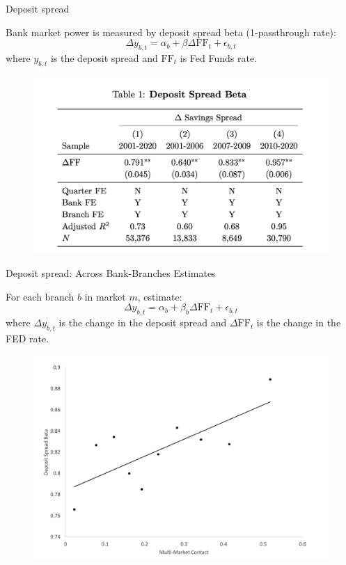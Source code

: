 \documentclass[notes,10.2pt, aspectratio=169]{beamer}
\newenvironment{wideitemize}{\itemize\addtolength{\itemsep}{10pt}}{\enditemize}
\begin{document}
\begin{frame}{Deposit spread}
    \vspace{0.1cm}
    \begin{wideitemize}
    \item Bank market power is measured by deposit spread beta (1-passthrough rate): 
    $$\Delta y_{b, t}=\alpha_b+\beta \Delta \mathrm{FF}_t+\epsilon_{b, t}$$
    where $y_{b, t}$ is the deposit spread and $\mathrm{FF}_t$ is Fed Funds rate.


\begin{figure}[t*]
  \centering
  \includegraphics[width=.65\textwidth]{./imgs/table1.png}
\end{figure}



\end{wideitemize}

\end{frame}


\begin{frame}{Deposit spread: Across Bank-Branches Estimates}
  \vspace{0.1cm}
  \begin{wideitemize}
  \item For each branch $b$ in market $m$, estimate:
  $$\Delta y_{b, t}=\alpha_b+\beta_b \Delta \mathrm{FF}_t+\epsilon_{b, t}$$
  where $\Delta y_{b, t}$ is the change in the deposit spread and $\Delta \mathrm{FF}_t$ is the change in the FED rate.

  

\begin{figure}[t*]
  \centering
  \includegraphics[width=.5\textwidth]{./imgs/figure6.png}
\end{figure}



\end{wideitemize}

\end{frame}
\end{document}
